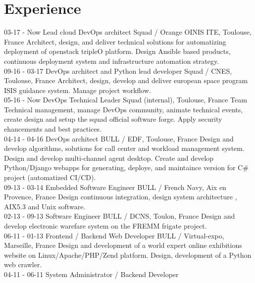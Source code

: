 \documentclass[]{friggeri-cv}
\begin{document}
\section{Experience}
\begin{entrylist}
    \entry
        {03-17 - Now}
        {Lead cloud DevOps architect}
        {Squad / Orange OINIS ITE, Toulouse, France}
        {Architect, design, and deliver technical solutions for automatizing deployment of openstack tripleO platform.
        Design Ansible based products, continuous deployment system and infrastructure automation strategy.\\}
    \entry
        {09-16 - 03-17}
        {DevOps architect and Python lead developer}
        {Squad / CNES, Toulouse, France}
        {Architect, design, develop and deliver european space program ISIS guidance system. Manage project workflow.\\}
    \entry
        {05-16 - Now}
        {DevOps Technical Leader}
        {Squad (internal), Toulouse, France}
        {Team Technical management, manage DevOps community, animate technical events, 
        create design and setup the squad official software forge. Apply security ehancements and best practices.\\}
    \entry
        {04-14 - 04-16}
        {DevOps architect}
        {BULL / EDF, Toulouse, France}
        {Design and develop algorithms, solutions for call center and workload management system. Design and develop multi-channel agent desktop.
        Create and develop Python/Django webapps for generating, deploye, and maintaince version for C\# project (automatized CI/CD).\\}
    \entry
        {09-13 - 03-14}
        {Embedded Software Engineer}
        {BULL / French Navy, Aix en Provence, France}
        {Design continuous integration, design system architecture , AIX5.3 and Unix software.\\}
    \entry
        {02-13 - 09-13}
        {Software Engineer}
        {BULL / DCNS, Toulon, France}
        {Design and develop electronic warefare system on the FREMM frigate project.\\}
    \entry
        {06-11 - 01-13}
        {Frontend / Backend Web Developer}
        {BULL / Virtual-expo, Marseille, France}
        {Design and development of a world expert online exhibitions website on Linux/Apache/PHP/Zend platform. Design, development of a Python web crawler.\\}
    \entry
        {04-11 - 06-11}
        {System Administrator / Backend Developer}

\end{entrylist}
\end{document}

